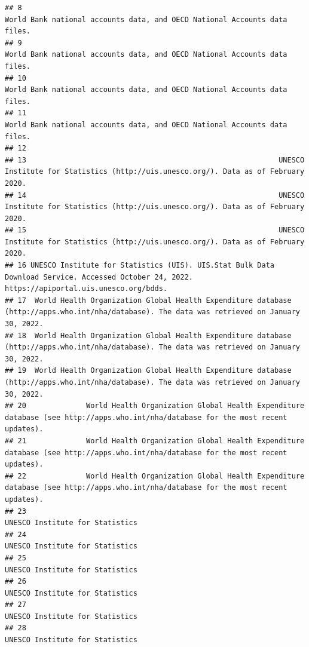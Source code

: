 \documentclass[
]{article}
\begin{document}
\begin{verbatim}
## 8                                                                      World Bank national accounts data, and OECD National Accounts data files.
## 9                                                                      World Bank national accounts data, and OECD National Accounts data files.
## 10                                                                     World Bank national accounts data, and OECD National Accounts data files.
## 11                                                                     World Bank national accounts data, and OECD National Accounts data files.
## 12                                                                                                                                              
## 13                                                           UNESCO Institute for Statistics (http://uis.unesco.org/). Data as of February 2020.
## 14                                                           UNESCO Institute for Statistics (http://uis.unesco.org/). Data as of February 2020.
## 15                                                           UNESCO Institute for Statistics (http://uis.unesco.org/). Data as of February 2020.
## 16 UNESCO Institute for Statistics (UIS). UIS.Stat Bulk Data Download Service. Accessed October 24, 2022. https://apiportal.uis.unesco.org/bdds.
## 17  World Health Organization Global Health Expenditure database (http://apps.who.int/nha/database). The data was retrieved on January 30, 2022.
## 18  World Health Organization Global Health Expenditure database (http://apps.who.int/nha/database). The data was retrieved on January 30, 2022.
## 19  World Health Organization Global Health Expenditure database (http://apps.who.int/nha/database). The data was retrieved on January 30, 2022.
## 20              World Health Organization Global Health Expenditure database (see http://apps.who.int/nha/database for the most recent updates).
## 21              World Health Organization Global Health Expenditure database (see http://apps.who.int/nha/database for the most recent updates).
## 22              World Health Organization Global Health Expenditure database (see http://apps.who.int/nha/database for the most recent updates).
## 23                                                                                                               UNESCO Institute for Statistics
## 24                                                                                                               UNESCO Institute for Statistics
## 25                                                                                                               UNESCO Institute for Statistics
## 26                                                                                                               UNESCO Institute for Statistics
## 27                                                                                                               UNESCO Institute for Statistics
## 28                                                                                                               UNESCO Institute for Statistics
\end{verbatim}
\end{document}
